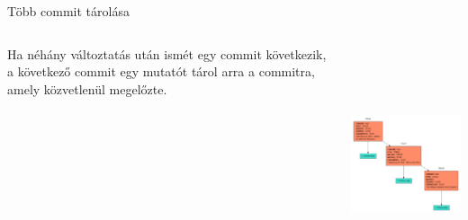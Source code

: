 \documentclass[english, aspectratio=169]{beamer}
\begin{document}
\begin{frame}{Több commit tárolása}
\begin{columns}
\begin{column}{.4\textwidth}
Ha néhány változtatás után ismét egy commit következik, a következő commit egy mutatót tárol arra a commitra, amely közvetlenül megelőzte.\\
\end{column}
\begin{column}{.6\textwidth}
\begin{center}
\includegraphics[height=7cm, keepaspectratio]{graphs/git_8.png}
\end{center}
\end{column}
\end{columns}
\end{frame}
\end{document}
